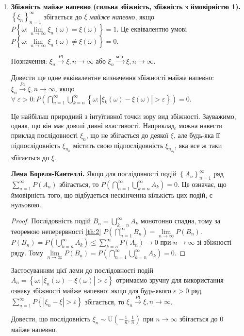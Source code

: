 \begin{enumerate}
    \item \textbf{Збіжність майже напевно (сильна збіжність, збіжність з ймовірністю 1).}
    \noindent$\left\{ \xi_n\right\}_{n=1}^{\infty}$ збігається до $\xi$ \emph{майже напевно}, якщо
    $P\left\{ \omega: \underset{n\to\infty}{\lim} \xi_n(\omega) = \xi(\omega)\right\} = 1$. 
    Це еквівалентно умові $P\left\{ \omega: \underset{n\to\infty}{\lim} \xi_n(\omega) \neq \xi(\omega)\right\} = 0$.

    Позначення: $\xi_n \overset{P1}{\longrightarrow} \xi, n \to \infty$ або $\xi_n \overset{\text{м.н.}}{\longrightarrow} \xi, n \to \infty$.
    \begin{exercise}
        Довести ще одне еквівалентне визначення збіжності майже напевно: $\xi_n \overset{P1}{\longrightarrow} \xi, n \to \infty$, якщо
        $\forall \; \varepsilon > 0: P\left( \bigcap\limits_{n=1}^{\infty} \bigcup\limits_{k = n}^{\infty}
        \left\{ \omega : \left| \xi_k(\omega) - \xi(\omega)\right| > \varepsilon\right\}\right) = 0$.
    \end{exercise}

    Це найбільш природний з інтуїтивної точки зору вид збіжності. Зауважимо, однак, що він має доволі дивні властивості. Наприклад, можна навести приклад
    послідовності $\xi_n$, що не збігається до деякої $\xi$, але будь-яка її підпослідовність $\xi_{n_k}$ містить свою підпослідовність
    $\xi_{n_{k_l}}$, яка все ж таки збігається до $\xi$.
    
    \textbf{Лема Бореля-Кантеллі.} Якщо для послідовності подій $\left\{A_n \right\}_{n=1}^{\infty}$ ряд
    $\sum\limits_{n=1}^{\infty} P(A_n)$ збігається, то $P\left( \bigcap\limits_{n=1}^{\infty} \bigcup\limits_{k = n}^{\infty} A_k\right) = 0$.
    Це означає, що ймовірність того, що відбудеться нескінченна кількість цих подій, є нульовою.
    \begin{proof}
        Послідовність подій $B_n = \bigcup\limits_{k = n}^{\infty} A_k$ монотонно спадна, тому за теоремою неперервності \ref{th:2}
        $P\left( \bigcap\limits_{n=1}^{\infty} B_n\right) = \underset{n\to\infty}{\lim} P(B_n)$.
        $P(B_n) = P\left( \bigcup\limits_{k = n}^{\infty} A_k\right) \leq \sum\limits_{k=n}^{\infty}P(A_n) \to 0$ при $n\to \infty$ 
        зі збіжності ряду. Тому $\underset{n\to\infty}{\lim} P(B_n) = P\left( \bigcap\limits_{n=1}^{\infty} \bigcup\limits_{k = n}^{\infty} A_k\right) = 0$.
    \end{proof}
    Застосуванням цієї леми до послідовності подій $A_n = \left\{ \omega : \left| \xi_n(\omega) - \xi(\omega)\right| > \varepsilon\right\}$ отримаємо зручну для використання
    ознаку збіжності майже напевно: якщо для будь-якого $\varepsilon >0$ ряд
    $\sum\limits_{n=1}^{\infty} P\left\{\left| \xi_n - \xi\right| > \varepsilon\right\}$ збігається, то 
    $\xi_n \overset{P1}{\longrightarrow} \xi, n \to \infty$.
    \begin{example}
        Довести, що послідовність $\xi_n \sim \mathrm{U}(-\frac{1}{n}, \frac{1}{n})$ при $n\to\infty$ збігається до 0 майже напевно.
        

\end{example}
\end{enumerate}
